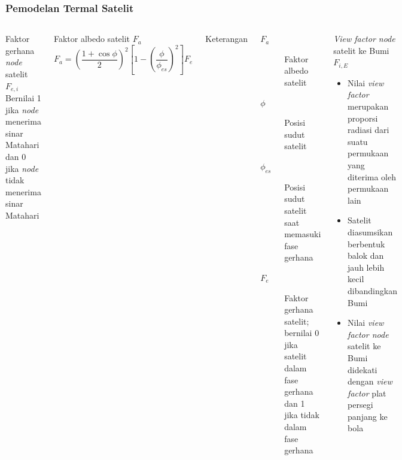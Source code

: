 \documentclass[8pt]{beamer}
\begin{document}
\begin{frame}
  \frametitle{Pemodelan Termal Satelit}
  \begin{columns}[T]
    \begin{block}{\center \normalsize Faktor gerhana \textit{node} satelit $F_{e,i}$}
      Bernilai 1 jika \textit{node} menerima sinar Matahari dan 0 jika \textit{node} tidak menerima sinar Matahari
    \end{block}
    \begin{block}{\center \normalsize Faktor albedo satelit $F_a$}
      \begin{equation}
\label{eq:albedofactor}
F_a = \left( \frac{1 + \cos{\phi}}{2} \right)^2 \left[ 1 - \left( \frac{\phi}{\phi_{es}} \right)^2 \right] F_e
\end{equation}
    \end{block}
    \center Keterangan
    \small
      \begin{description}
        \item[$F_a$] Faktor albedo satelit
        \item[$\phi$] Posisi sudut satelit
        \item[$\phi_{es}$] Posisi sudut satelit saat memasuki fase gerhana
        \item[$F_e$] Faktor gerhana satelit; bernilai 0 jika satelit dalam fase gerhana dan 1 jika tidak dalam fase gerhana

\end{description}
    \begin{block}{\center \normalsize \textit{View factor node} satelit ke Bumi $F_{i,E}$}
      \begin{itemize}
        \item Nilai \textit{view factor} merupakan proporsi radiasi dari suatu permukaan yang diterima oleh permukaan lain
        \item Satelit diasumsikan berbentuk balok dan jauh lebih kecil dibandingkan Bumi
        \item Nilai \textit{view factor node} satelit ke Bumi didekati dengan \textit{view factor} plat persegi panjang ke bola
      \end{itemize}
    \end{block}
  \end{columns}
\end{frame}
\end{document}
